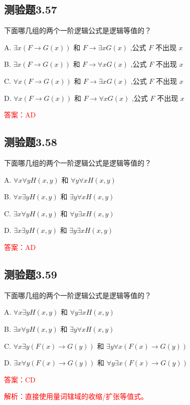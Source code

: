 \documentclass[UTF8, heading=true]{ctexart}
\begin{document}
\subsection{测验题3.57}

下面哪几组的两个一阶逻辑公式是逻辑等值的？

A. $\exists x(F \rightarrow G(x))$ 和 $F \rightarrow \exists x G(x)$ ,公式 $F$ 不出现 $x$

B. 
$\exists x(F \rightarrow G(x))$ 和 $F \rightarrow \forall x G(x)$ ,公式 $F$ 不出现 $x$

C. 
$\forall x(F \rightarrow G(x))$ 和 $F \rightarrow \exists x G(x)$ ,公式 $F$ 不出现 $x$

D. 
$\forall x(F \rightarrow G(x))$ 和 $F \rightarrow \forall x G(x)$ ,公式 $F$ 不出现 $x$

\textcolor{red}{答案：AD}

\subsection{测验题3.58}

下面哪几组的两个一阶逻辑公式是逻辑等值的？

A. $\forall x \forall y H(x, y)$ 和 $\forall y \forall x H(x, y)$

B. $\forall x \exists y H(x, y)$ 和 $\exists y \forall x H(x, y)$

C. $\exists x \forall y H(x, y)$ 和 $\forall y \exists x H(x, y)$

D. $\exists x \exists y H(x, y)$ 和 $\exists y \exists x H(x, y)$

\textcolor{red}{答案：AD}

\subsection{测验题3.59}

下面哪几组的两个一阶逻辑公式是逻辑等值的？

A. $\forall x \exists y H(x, y)$ 和 $\forall y \exists x H(x, y)$

B. $\exists x \forall y H(x, y)$ 和 $\exists y \forall x H(x, y)$

C. $\forall x \exists y(F(x) \rightarrow G(y))$ 和 $\exists y \forall x(F(x) \rightarrow G(y))$

D. $\exists x \forall y(F(x) \rightarrow G(y))$ 和 $\forall y \exists x(F(x) \rightarrow G(y))$

\textcolor{red}{答案：CD}

\textcolor{red}{解析：直接使用量词辖域的收缩/扩张等值式。}
\end{document}
